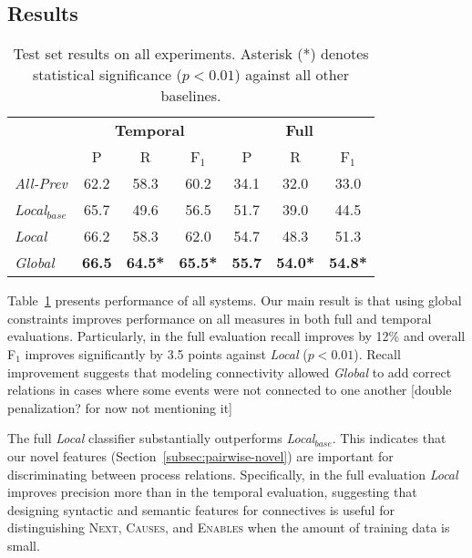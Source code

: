 \subsection{Results}

\begin{table}[t]
{\footnotesize
\begin{tabular}{| l | c | c | c | c | c | c |}
\hline
    & \multicolumn{3}{c|}{\textbf{Temporal}} & \multicolumn{3}{c|}{\textbf{Full}} \\
    & P & R & F$_1$ & P & R & F$_1$ \\
\hline
\hline
\emph{All-Prev} & 62.2 & 58.3 & 60.2 & 34.1 & 32.0 & 33.0 \\
\emph{Local$_{base}$} & 65.7 & 49.6 & 56.5 &  51.7 & 39.0 & 44.5\\
\emph{Local} & 66.2 & 58.3 & 62.0 & 54.7 & 48.3 & 51.3 \\
\emph{Global} & \textbf{66.5} & \textbf{64.5*} & \textbf{65.5*} & \textbf{55.7} & \textbf{54.0*} & \textbf{54.8*} \\
\hline
\end{tabular}}
\caption{Test set results on all experiments. Asterisk (*) denotes statistical significance ($p<0.01$) against all other baselines.}
\label{tab:results}
\end{table}

Table~\ref{tab:results} presents performance of all systems. Our main result is that using global constraints improves performance on all measures in both full and temporal evaluations. Particularly, in the full evaluation recall improves by 12\% and overall F$_1$ improves significantly by 3.5 points against \emph{Local} ($p<0.01$). Recall improvement suggests that modeling connectivity allowed \emph{Global} to add correct relations in cases where some events were not connected to one another [double penalization? for now not mentioning it]

The full \emph{Local} classifier substantially outperforms \emph{Local$_{base}$}. This indicates that our novel features (Section~\ref{subsec:pairwise-novel}) are important for discriminating between process relations. Specifically, in the full evaluation \emph{Local} improves precision more than in the temporal evaluation, suggesting that designing syntactic and semantic features for connectives is useful for distinguishing \textsc{Next}, \textsc{Causes}, and \textsc{Enables} when the amount of training data is small.

